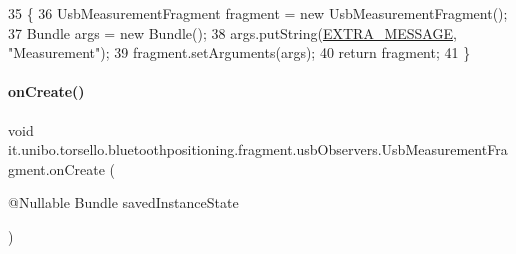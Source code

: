 \begin{DoxyCode}
35                                                        \{
36         UsbMeasurementFragment fragment = \textcolor{keyword}{new} UsbMeasurementFragment();
37         Bundle args = \textcolor{keyword}{new} Bundle();
38         args.putString(\hyperlink{classit_1_1unibo_1_1torsello_1_1bluetoothpositioning_1_1fragment_1_1usbObservers_1_1UsbMeasurementFragment_a46f0a0e379c852c7418ce13340077a70_a46f0a0e379c852c7418ce13340077a70}{EXTRA\_MESSAGE}, \textcolor{stringliteral}{"Measurement"});
39         fragment.setArguments(args);
40         \textcolor{keywordflow}{return} fragment;
41     \}
\end{DoxyCode}
\hypertarget{classit_1_1unibo_1_1torsello_1_1bluetoothpositioning_1_1fragment_1_1usbObservers_1_1UsbMeasurementFragment_a232e0530117fcd2e3d1e41767a774ed1_a232e0530117fcd2e3d1e41767a774ed1}{}\label{classit_1_1unibo_1_1torsello_1_1bluetoothpositioning_1_1fragment_1_1usbObservers_1_1UsbMeasurementFragment_a232e0530117fcd2e3d1e41767a774ed1_a232e0530117fcd2e3d1e41767a774ed1} 
\paragraph{\texorpdfstring{on\+Create()}{onCreate()}}
{\footnotesize\ttfamily void it.\+unibo.\+torsello.\+bluetoothpositioning.\+fragment.\+usb\+Observers.\+Usb\+Measurement\+Fragment.\+on\+Create (\begin{DoxyParamCaption}\item[{@Nullable Bundle}]{saved\+Instance\+State }\end{DoxyParamCaption})}


